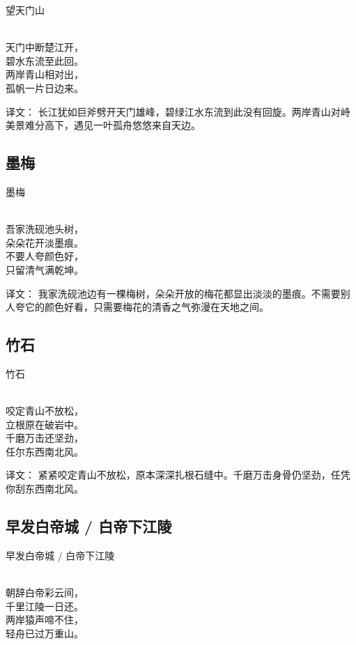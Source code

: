 \noindent 望天门山

  \\

\noindent 天门中断楚江开，\\碧水东流至此回。\\
两岸青山相对出，\\孤帆一片日边来。

译文：
长江犹如巨斧劈开天门雄峰，碧绿江水东流到此没有回旋。两岸青山对峙美景难分高下，遇见一叶孤舟悠悠来自天边。

\subsection{墨梅}

\noindent 墨梅

  \\

\noindent 吾家洗砚池头树，\\朵朵花开淡墨痕。\\
不要人夸颜色好，\\只留清气满乾坤。

译文：
我家洗砚池边有一棵梅树，朵朵开放的梅花都显出淡淡的墨痕。不需要别人夸它的颜色好看，只需要梅花的清香之气弥漫在天地之间。

\subsection{竹石}

\noindent 竹石

  \\

\noindent 咬定青山不放松，\\立根原在破岩中。\\
千磨万击还坚劲，\\任尔东西南北风。

译文：
紧紧咬定青山不放松，原本深深扎根石缝中。千磨万击身骨仍坚劲，任凭你刮东西南北风。

\subsection{早发白帝城 / 白帝下江陵}

\noindent 早发白帝城 / 白帝下江陵

  \\

\noindent 朝辞白帝彩云间，\\千里江陵一日还。\\
两岸猿声啼不住，\\轻舟已过万重山。

